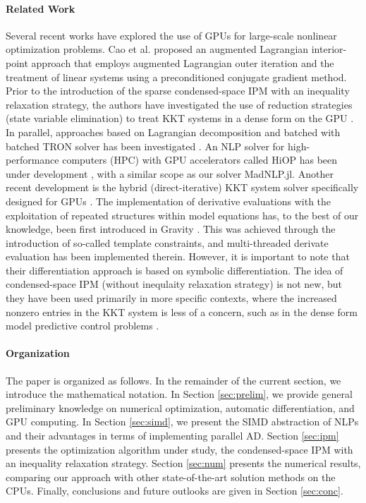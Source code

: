 \paragraph*{Related Work}
Several recent works have explored the use of GPUs for large-scale
nonlinear optimization problems. Cao et al. \cite{cao2016augmented}
proposed an augmented Lagrangian interior-point approach that employs
augmented Lagrangian outer iteration and the treatment of linear
systems using a preconditioned conjugate gradient method. Prior to the
introduction of the sparse condensed-space IPM with an inequality relaxation
strategy, the authors have investigated the use of reduction
strategies (state variable elimination) to treat KKT systems in a
dense form on the GPU
\cite{pacaud2023parallel,pacaud2022feasible,pacaud2023accelerating}.
In parallel, approaches based on Lagrangian decomposition and
batched with batched TRON solver \cite{lin1999newton}
has been investigated \cite{kim2022accelerated,kim2021leveraging}.
An NLP solver for high-performance computers (HPC) with GPU
accelerators called HiOP has been under development
\cite{hiop_techrep}, with a similar scope as our solver MadNLP.jl.
 Another recent development is the hybrid (direct-iterative) KKT
system solver specifically designed for GPUs \cite{regev2023hykkt}.
The implementation of derivative evaluations with the exploitation of
repeated structures within model equations has, to the best of our
knowledge, been first introduced in Gravity \cite{Gravity}. This was
achieved through the introduction of so-called template constraints,
and multi-threaded derivate evaluation has been implemented therein.
However, it is important to note that their differentiation approach
is based on symbolic differentiation.
The idea of condensed-space IPM (without inequlaity relaxation
strategy) is not new, but they have been used primarily in more
specific contexts, where the increased nonzero entries in the KKT system
is less of a concern, such as in the dense form model predictive control
problems \cite{jerez2012sparse,cole2023exploiting}.


\paragraph*{Organization}
The paper is organized as follows. In the remainder of the current
section, we introduce the mathematical notation. In Section
\ref{sec:prelim}, we provide general preliminary knowledge on
numerical optimization, automatic differentiation, and GPU computing.
In Section \ref{sec:simd}, we present the SIMD abstraction of NLPs and
their advantages in terms of implementing parallel AD. Section
\ref{sec:ipm} presents the optimization algorithm under study, the
condensed-space IPM with an inequality relaxation strategy. Section
\ref{sec:num} presents the numerical results, comparing our approach
with other state-of-the-art solution methods on the CPUs. Finally,
conclusions and future outlooks are given in Section \ref{sec:conc}.

